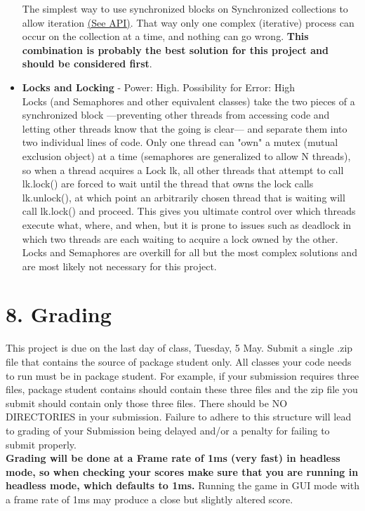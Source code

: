 \documentclass[11pt]{article}
\begin{document}
\begin{itemize}
The simplest way to use synchronized blocks on Synchronized collections to allow iteration \href{http://docs.oracle.com/javase/7/docs/api/java/util/Collections.html\#synchronizedCollection(java.util.Collection)}{({\color{blue}\underline{See API}})}. That way only one complex (iterative) process can occur on the collection at a time, and nothing can go wrong. \textbf{This combination is probably the best solution for this project and should be considered first}.
\item \textbf{Locks and Locking} - Power: High. Possibility for Error: High\\
Locks (and Semaphores and other equivalent classes) take the two pieces of a synchronized block ---preventing other threads from accessing code and letting other threads know that the going is clear--- and separate them into two individual lines of code. Only one thread can "own" a mutex (mutual exclusion object) at a time (semaphores are generalized to allow N threads), so when a thread acquires a Lock lk, all other threads that attempt to call lk.lock() are forced to wait until the thread that owns the lock calls lk.unlock(), at which point an arbitrarily chosen thread that is waiting will call lk.lock() and proceed. This gives you ultimate control over which threads execute what, where, and when, but it is prone to issues such as deadlock in which two threads are each waiting to acquire a lock owned by the other. Locks and Semaphores are overkill for all but the most complex solutions and are most likely not necessary for this project. 
\end{itemize}

\section{8. Grading}
This project is due on the last day of class, Tuesday, 5 May.
Submit a single .zip file that contains the source of package student only. All classes your code needs to run must be in package student.  For example, if your submission requires three files, package student contains should contain these three files and the zip file you submit should contain only those three files.  There should be NO DIRECTORIES in your submission.  Failure to adhere to this structure will lead to grading of your Submission being delayed and/or a penalty for failing to submit properly.\\

\textbf{Grading will be done at a Frame rate of 1ms (very fast) in headless mode, so when checking your scores make sure that you are running in headless mode, which defaults to 1ms.} Running the game in GUI mode with a frame rate of 1ms may produce a close but slightly altered score.\\ 
\end{document}

